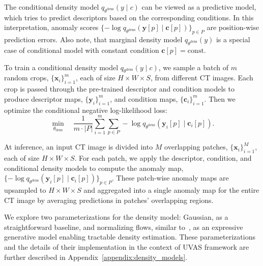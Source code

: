 The conditional density model \( q_{\theta^{\text{dens}}}(y \mid c) \) can be viewed as a predictive model, which tries to predict descriptors based on the corresponding conditions. In this interpretation, anomaly scores
$
\{-\log q_{\theta^{\text{dens}}}(\mathbf{y}[p] \mid \mathbf{c}[p])\}_{p \in P}
$
are position-wise prediction errors. Also note, that marginal density model \( q_{\theta^{\text{dens}}}(y)\) is a special case of conditional model with constant condition $\mathbf{c}[p] = \mathrm{const}$.

To train a conditional density model \( q_{\theta^{\text{dens}}}(y \mid c) \), we sample a batch of \( m \) random crops, \(\{\mathbf{x}_i\}_{i=1}^m\), each of size \( H \times W \times S \), from different CT images. Each crop is passed through the pre-trained descriptor and condition models to produce descriptor maps, \(\{\mathbf{y}_i\}_{i=1}^m\), and condition maps, \(\{\mathbf{c}_i\}_{i=1}^m\). Then we optimize the conditional negative log-likelihood loss:
\[
  \min_{\theta_{\text{dens}}} \quad \frac{1}{m \cdot |P|} \sum_{i=1}^m \sum_{p \in P} -\log q_{\theta^{\text{dens}}}(\mathbf{y}_i[p] \mid \mathbf{c}_i[p]).
\]

At inference, an input CT image is divided into \( M \) overlapping patches, \(\{\mathbf{x}_i\}_{i=1}^M\), each of size \( H \times W \times S \). For each patch, we apply the descriptor, condition, and conditional density models to compute the anomaly map, \(\{-\log q_{\theta^{\text{dens}}}(\mathbf{y}_i[p] \mid \mathbf{c}_i[p])\}_{p \in P}\). These patch-wise anomaly maps are upsampled to \( H \times W \times S \) and aggregated into a single anomaly map for the entire CT image by averaging predictions in patches' overlapping regions.

We explore two parameterizations for the density model: Gaussian, as a straightforward baseline, and normalizing flows, similar to~\cite{cflow,msflow}, as an expressive generative model enabling tractable density estimation. These parameterizations and the details of their implementation in the context of UVAS framework are further described in Appendix~\ref{appendix:density_models}.
